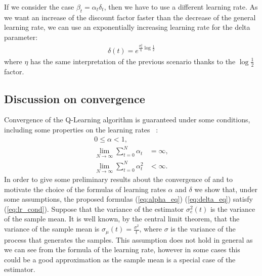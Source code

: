 \documentclass[conference]{IEEEtran}
\begin{document}
If we consider the case $\beta_t=\alpha_t\delta_t$, then we have to use a different learning rate. As we want an increase of the discount factor faster than the decrease of the general learning rate, we can use an exponentially increasing learning rate for the delta parameter:
\begin{align}\label{eq:delta_eq}
 \delta(t) = e^{\frac{\sigma_e^2}{\eta}\log\frac{1}{2}}
\end{align}
where $\eta$ has the same interpretation of the previous scenario thanks to the $\log\frac{1}{2}$ factor.

\subsection{Discussion on convergence}
Convergence of the Q-Learning algorithm is guaranteed under some conditions, including some properties on the learning rates ~\cite{EvenDar2001, watkins1992q}:
\begin{align}
 0 \leq \alpha < 1,\nonumber \\
 \lim_{N\rightarrow\infty} \sum_{t=0}^{N}\alpha_t & = \infty,\nonumber \\
 \lim_{N\rightarrow\infty} \sum_{t=0}^{N}\alpha_t^2 & < \infty. \label{eq:lr_cond}
\end{align}
In order to give some preliminary results about the convergence of \alg and to motivate the choice of the formulas of learning rates $\alpha$ and $\delta$ we show that, under some assumptions, the proposed formulas (\ref{eq:alpha_eq}) (\ref{eq:delta_eq}) satisfy (\ref{eq:lr_cond}). Suppose that the variance of the estimator $\sigma_e^2(t)$ is the variance of the sample mean. It is well known, by the central limit theorem, that the variance of the sample mean is $\sigma_{\mu}(t)=\frac{\sigma^2}{t}$, where $\sigma$ is the variance of the process that generates the samples.
This assumption does not hold in general as we can see from the formula of the learning rate, however in some cases this could be a good approximation as the sample mean is a special case of the estimator.
\end{document}
